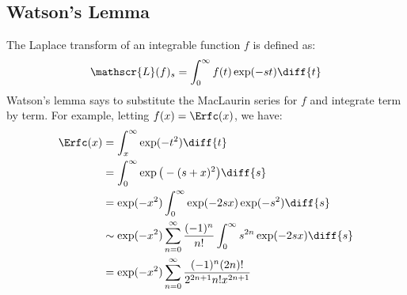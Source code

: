         \subsection{Watson's Lemma}
            The Laplace transform of an integrable function $f$
            is defined as:
            \begin{equation}
                \mathscr{L}(f)_{s}=\int_{0}^{\infty}
                    f(t)\exp(-st)\diff{t}
            \end{equation}
            Watson's lemma says to substitute the MacLaurin
            series for $f$ and integrate term by term. For example,
            letting $f(x)=\Erfc(x)$, we have:
            \begin{align}
                \Erfc(x)&=\int_{x}^{\infty}\exp(-t^{2})\diff{t}\\
                &=\int_{0}^{\infty}\exp\big(-(s+x)^{2}\big)\diff{s}\\
                &=\exp(-x^{2})\int_{0}^{\infty}
                    \exp(-2sx)\exp(-s^{2})\diff{s}\\
                &\sim
                \exp(-x^{2})\sum_{n=0}^{\infty}\frac{(-1)^{n}}{n!}
                    \int_{0}^{\infty}s^{2n}\exp(-2sx)\diff{s}\\
                &=\exp(-x^{2})\sum_{n=0}^{\infty}
                    \frac{(-1)^{n}(2n)!}{2^{2n+1}n!x^{2n+1}}
            \end{align}
